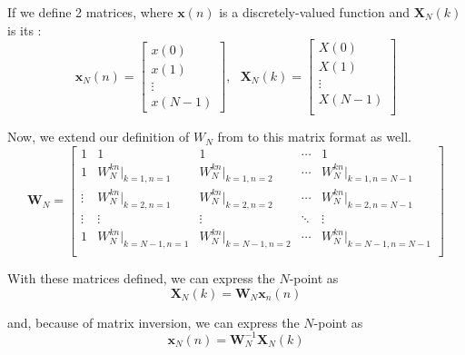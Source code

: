 If we define 2 matrices, where $\mathbf{x}(n)$ is a discretely-valued function and $\mathbf{X}_{N}(k)$ is its :
\begin{equation}\label{eq:DFT_Function_Matrices}
  \mathbf{x}_{N}(n) =
  \begin{bmatrix}
    x(0) \\
    x(1) \\
    \vdots \\
    x(N -1)
  \end{bmatrix},\:\:\:
  \mathbf{X}_{N}(k) =
  \begin{bmatrix}
    X(0) \\
    X(1) \\
    \vdots \\
    X(N-1) \\
  \end{bmatrix}
\end{equation}

Now, we extend our definition of $W_{N}$ from  to this matrix format as well.
\begin{equation}\label{eq:DFT_W_Matrix}
  \mathbf{W}_{N} =
  \begin{bmatrix}
    1 & 1 & 1 & \cdots & 1 \\
    1 & W_{N}^{kn} \vert_{k=1, n=1} & W_{N}^{kn} \vert_{k=1, n=2} & \cdots & W_{N}^{kn} \vert_{k=1, n=N-1} \\
    \vdots & W_{N}^{kn} \vert_{k=2, n=1} & W_{N}^{kn} \vert_{k=2, n=2} & \cdots & W_{N}^{kn} \vert_{k=2, n=N-1} \\
    \vdots & \vdots & \vdots & \ddots & \vdots \\
    1 & W_{N}^{kn} \vert_{k=N-1, n=1} & W_{N}^{kn} \vert_{k=N-1, n=2} & \cdots & W_{N}^{kn} \vert_{k=N-1, n=N-1} \\
  \end{bmatrix}
\end{equation}

With these matrices defined, we can express the $N$-point  as
\begin{equation}\label{eq:DFT_Matrix}
  \mathbf{X}_{N}(k) = \mathbf{W}_{N} \mathbf{x}_{n}(n)
\end{equation}

and, because of matrix inversion, we can express the $N$-point  as
\begin{equation}\label{eq:IDFT_Matrix_Inverted_W_Matrix}
  \mathbf{x}_{N}(n) = \mathbf{W}_{N}^{-1} \mathbf{X}_{N}(k)
\end{equation}

